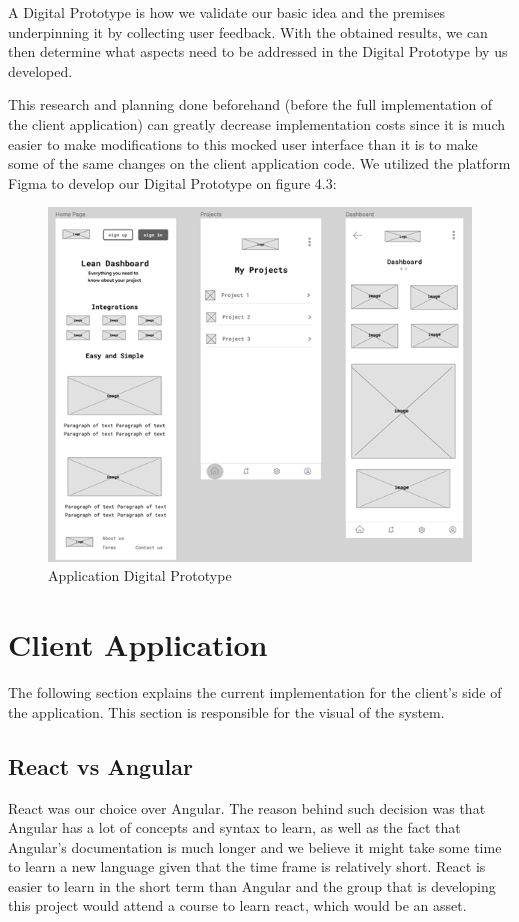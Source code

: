 \documentclass[a4paper,twoside,10pt]{report}
\begin{document}
A Digital Prototype is how we validate our basic idea and the premises underpinning it by collecting user feedback.
With the obtained results, we can then determine what aspects need to be addressed in the Digital Prototype by us developed.
 
This research and planning done beforehand (before the full implementation of the client application) can greatly decrease implementation costs since it is much easier to make modifications to this mocked user interface than it is to make some of the same changes on the client application code.
We utilized the platform Figma\cite{FIGMA} to develop our Digital Prototype on figure 4.3:
 
\begin{figure}[h!]
\center
    \includegraphics[width=\textwidth]{digital-prototype.png}
\caption{Application Digital Prototype}
\end{figure}

\chapter{Client Application}
The following section explains the current implementation for the client’s side of the application. This section is responsible for the visual of the system.
 
\section{React vs Angular}
React was our choice over Angular. The reason behind such decision was that Angular has a lot of concepts and syntax to learn, as well as the fact that Angular's documentation is much longer and we believe it might take some time to learn a new language given that the time frame is relatively short. React is easier to learn in the short term than Angular and the group that is developing this project would attend a course to learn react, which would be an asset.
\end{document}
